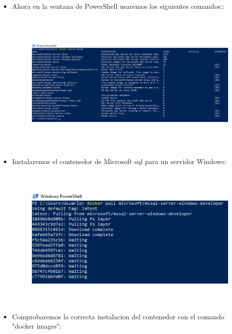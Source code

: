 \begin{itemize}
	\item Ahora en la ventana de PowerShell usaremos los siguientes comandos::\\
	
	
	\begin{figure}[htb]
	\begin{center}
	\includegraphics[width=17cm, height=7cm]{./Imagenes/dockersearch}
	\end{center}
	\end{figure}
	\clearpage
	\item Instalaremos el contenedor de Microsoft sql para un servidor Windows:\\
			
	\begin{figure}[htb]
	\begin{center}
	\includegraphics[width=17cm, height=7cm]{./Imagenes/windows}
	\end{center}
	\end{figure}
	
	\item Comprobaremos la correcta instalacion del contenedor con el comando "docker images":\\
	

\end{itemize}
